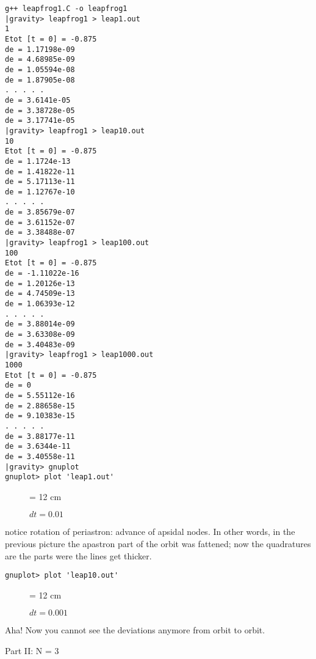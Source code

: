 \documentclass{book}
\begin{document}
\begin{small}
\begin{verbatim}
g++ leapfrog1.C -o leapfrog1
|gravity> leapfrog1 > leap1.out
1
Etot [t = 0] = -0.875
de = 1.17198e-09
de = 4.68985e-09
de = 1.05594e-08
de = 1.87905e-08
. . . . .
de = 3.6141e-05
de = 3.38728e-05
de = 3.17741e-05
|gravity> leapfrog1 > leap10.out
10
Etot [t = 0] = -0.875
de = 1.1724e-13
de = 1.41822e-11
de = 5.17113e-11
de = 1.12767e-10
. . . . .
de = 3.85679e-07
de = 3.61152e-07
de = 3.38488e-07
|gravity> leapfrog1 > leap100.out
100
Etot [t = 0] = -0.875
de = -1.11022e-16
de = 1.20126e-13
de = 4.74509e-13
de = 1.06393e-12
. . . . .
de = 3.88014e-09
de = 3.63308e-09
de = 3.40483e-09
|gravity> leapfrog1 > leap1000.out
1000
Etot [t = 0] = -0.875
de = 0
de = 5.55112e-16
de = 2.88658e-15
de = 9.10383e-15
. . . . .
de = 3.88177e-11
de = 3.6344e-11
de = 3.40558e-11
|gravity> gnuplot
gnuplot> plot 'leap1.out'
\end{verbatim}
\end{small}

\begin{figure}
\begin{center}
\leavevmode
\epsfxsize = 12 cm
\caption{$dt = 0.01$}
\label{fig:leap1}
\end{center}
\end{figure}

notice rotation of periastron: advance of apsidal nodes.
In other words, in the previous picture the apastron part of the orbit
was fattened; now the quadratures are the parts were the lines get thicker.

\begin{small}
\begin{verbatim}
gnuplot> plot 'leap10.out'
\end{verbatim}
\end{small}

\begin{figure}
\begin{center}
\leavevmode
\epsfxsize = 12 cm
\caption{$dt = 0.001$}
\label{fig:leap10}
\end{center}
\end{figure}

Aha!  Now you cannot see the deviations anymore from orbit to orbit.

\newpage

\begin{center}
{\lggb Part II: N = 3}
\end{center}
\end{document}
